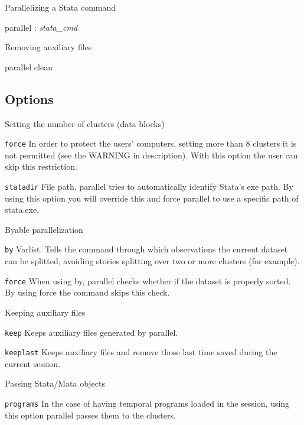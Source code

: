 \documentclass[bib]{statapress}
\begin{document}
\noindent Parallelizing a Stata command

\begin{stsyntax}
parallel
	: {\it stata\_cmd}
\end{stsyntax}

\noindent Removing auxiliary files

\begin{stsyntax}
parallel clean 
\end{stsyntax}

\subsection{Options}

\noindent Setting the number of clusters (data blocks)

\hangpara
{\tt force} In order to protect the users' computers, setting more than 8 clusters it is not permitted (see the WARNING in description). With this option the user can skip this restriction.

\hangpara
{\tt statadir} File path. parallel tries to automatically identify Stata's exe path. By using this option you will override this and force parallel to use a specific path of stata.exe.

\noindent Byable parallelization

\hangpara
{\tt by} Varlist. Tells the command through which observations the current dataset can be splitted, avoiding stories splitting over two or more clusters (for example).

\hangpara
{\tt force} When using by, parallel checks whether if the dataset is properly sorted. By using force the command skips this check.

\noindent Keeping auxiliary files

\hangpara
{\tt keep} Keeps auxiliary files generated by parallel.

\hangpara
{\tt keeplast} Keeps auxiliary files and remove those last time saved during the current session.

\noindent Passing Stata/Mata objects

\hangpara
{\tt programs} In the case of having temporal programs loaded in the session, using this option parallel passes them to the clusters.
\end{document}
